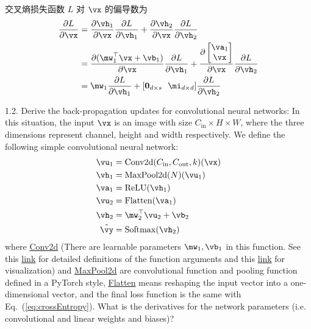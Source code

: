 \documentclass[openany]{ctexbook}
\theoremstyle{kaiti}
\theoremstyle{normal}
\begin{document}
交叉熵损失函数 $L$ 对 $\vx$ 的偏导数为
\begin{equation}
  \begin{aligned}
    \frac{\partial L}{\partial \vx}
    &=\frac{\partial \vh_1}{\partial \vx}\frac{\partial L}{\partial \vh_1}+\frac{\partial \vh_2}{\partial \vx}\frac{\partial L}{\partial \vh_2}\\
    &=\frac{\partial (\mw_1^\top\vx+\vb_1)}{\partial \vx}\frac{\partial L}{\partial \vh_1}+\frac{\partial \begin{bmatrix}
      \va_1\\\vx\\
    \end{bmatrix}}{\partial \vx}\frac{\partial L}{\partial \vh_2}\\
    &=\mw_1\frac{\partial L}{\partial \vh_1}+[\bm{0}_{d\times s}~~\mi_{d\times d}]\frac{\partial L}{\partial \vh_2}\\
  \end{aligned}
\end{equation}

1.2. Derive the back-propagation updates for convolutional neural networks: In this situation, the input $\vx$ is an image with size $C_{\mathrm{in}} \times H \times W$, where the three dimensions represent channel, height and width respectively. We define the following simple convolutional neural network:
\begin{align}
  \vu_1 &= \mathrm{Conv2d}(C_{\mathrm{in}}, C_{\mathrm{out}}, k)(\vx) \\
  \vh_1 &= \mathrm{MaxPool2d}(N)(\vu_1) \\
  \va_1 &= \mathrm{ReLU}(\vh_1) \\
  \vu_2 &= \mathrm{Flatten}(\va_1) \\
  \vh_2 &= \mw_2^\top\vu_2 + \vb_2\\
  \hat{\vy} &= \mathrm{Softmax}(\vh_2)
\end{align}
where \href{https://pytorch.org/docs/stable/generated/torch.nn.Conv2d.html}{Conv2d} (There are learnable parameters $\mw_1, \vb_1$ in this function. See this \href{https://pytorch.org/docs/stable/generated/torch.nn.Conv2d.html}{link} for detailed definitions of the function arguments and this \href{https://github.com/vdumoulin/conv_arithmetic/blob/master/README.md}{link} for visualization) and \href{https://pytorch.org/docs/stable/generated/torch.nn.MaxPool2d.html}{MaxPool2d} are convolutional function and pooling function defined in a PyTorch style, \href{https://pytorch.org/docs/stable/generated/torch.flatten.html}{Flatten} means reshaping the input vector into a one-dimensional vector, and the final loss function is the same with Eq.~(\ref{eq:crossEntropy}). What is the derivatives for the network parameters (i.e. convolutional and linear weights and biases)?
\end{document}
